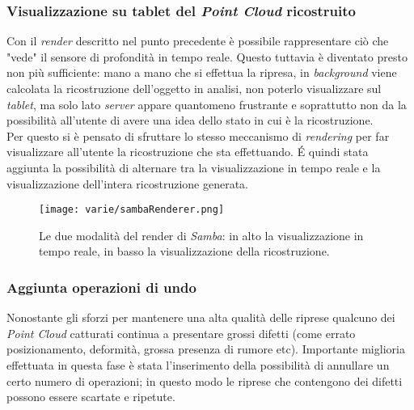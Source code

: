\subsubsection{Visualizzazione su tablet del \emph{Point Cloud} ricostruito}
Con il \emph{render} descritto nel punto precedente è possibile rappresentare ciò che "vede" il sensore di profondità in tempo reale. Questo tuttavia è diventato presto non più sufficiente: mano a mano che si effettua la ripresa, in \emph{background} viene calcolata la ricostruzione dell'oggetto in analisi, non poterlo visualizzare sul \emph{tablet}, ma solo lato \emph{server} appare quantomeno frustrante e soprattutto non da la possibilità all'utente di avere una idea dello stato in cui è la ricostruzione. \\
Per questo si è pensato di sfruttare lo stesso meccanismo di \emph{rendering} per far visualizzare all'utente la ricostruzione che sta effettuando. É quindi stata aggiunta la possibilità di alternare tra la visualizzazione in tempo reale e la visualizzazione dell'intera ricostruzione generata.\\
\begin{figure}[H] 
    \centering 
    \texttt{[image: varie/sambaRenderer.png]} 
    \caption{Le due modalità del render di \emph{Samba}: in alto la visualizzazione in tempo reale, in basso la visualizzazione della ricostruzione.}
    \label{fig:render-rajawali}
\end{figure}


\subsubsection{Aggiunta operazioni di undo}
Nonostante gli sforzi per mantenere una alta qualità delle riprese qualcuno dei \emph{Point Cloud} catturati continua a presentare grossi difetti (come errato posizionamento, deformità, grossa presenza di rumore etc).
Importante miglioria effettuata in questa fase è stata l'inserimento della possibilità di annullare un certo numero di operazioni; in questo modo le riprese che contengono dei difetti possono essere scartate e ripetute.

